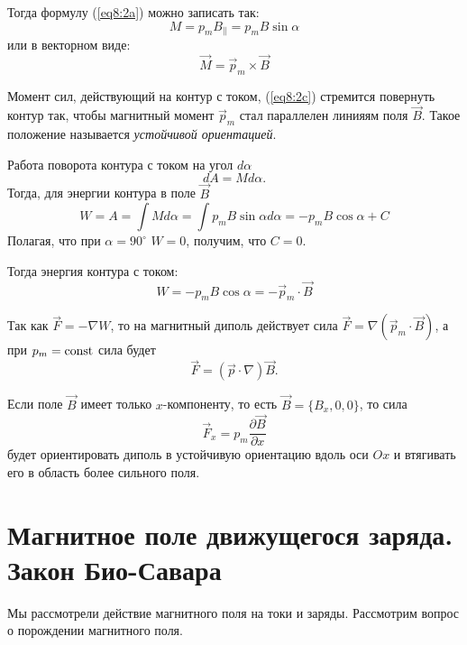     Тогда формулу (\ref{eq8:2a}) можно записать так:
    \[
        M = p_mB_{\|} = p_mB\sin\alpha
    \]
    или в векторном виде:
    \begin{equation}
        \vec{M} = \vec{p}_m \times \vec{B}
        \label{eq8:2c}
    \end{equation}
    
    Момент сил, действующий на контур с током, (\ref{eq8:2c}) стремится
    повернуть контур так, чтобы магнитный момент \( \vec{p}_m \) стал параллелен
    линияям поля \( \vec{B} \). Такое положение называется \textit{устойчивой
    ориентацией}.
    
    Работа поворота контура с током на угол \( d\alpha \)
    \[
        dA = Md\alpha.
    \]
    Тогда, для энергии контура в поле \( \vec{B} \)
    \[
        W = A = \int Md\alpha = \int p_mB\sin\alpha d\alpha = -p_mB\cos\alpha +
        C
    \]
    Полагая, что при \( \alpha = 90^{\circ} \) \( W = 0 \), получим, что
    \( C = 0 \).
    
    Тогда энергия контура с током:
    \begin{equation}
        W = -p_mB\cos\alpha = -\vec{p}_m \cdot \vec{B}
        \label{eq8:2d}
    \end{equation}
    
    Так как \( \vec{F} = -\nabla W \), то на магнитный диполь действует сила
    \( \vec{F} = \nabla(\vec{p}_m\cdot\vec{B}) \), а при \( p_m = \mathrm{const} \) сила
    будет
    \[
        \vec{F} = (\vec{p}\cdot\nabla)\vec{B}.
    \]
    
    Если поле \( \vec{B} \) имеет только \( x \)-компоненту, то есть
    \( \vec{B} = \{B_x, 0 , 0\} \), то сила
    \[
        \vec{F}_x = p_m\frac{\partial \vec{B}}{\partial x}
    \]
    будет ориентировать диполь в устойчивую ориентацию вдоль оси \( Ox \) и
    втягивать его в область более сильного поля.
    
\section{Магнитное поле движущегося заряда. Закон Био-Савара}

    Мы рассмотрели действие магнитного поля на токи и заряды. Рассмотрим вопрос
    о порождении магнитного поля.
    
